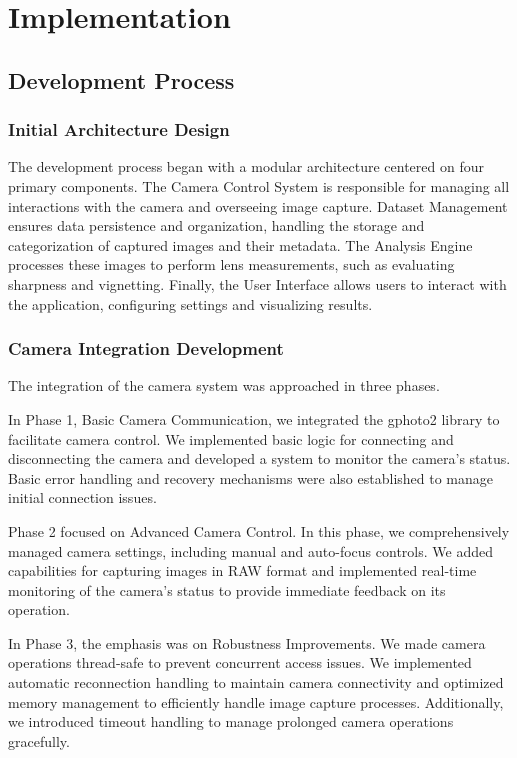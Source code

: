 \chapter{Implementation}

\section{Development Process}

\subsection{Initial Architecture Design}

The development process began with a modular architecture centered on four primary components. The Camera Control System is responsible for managing all interactions with the camera and overseeing image capture. Dataset Management ensures data persistence and organization, handling the storage and categorization of captured images and their metadata. The Analysis Engine processes these images to perform lens measurements, such as evaluating sharpness and vignetting. Finally, the User Interface allows users to interact with the application, configuring settings and visualizing results.

\subsection{Camera Integration Development}

The integration of the camera system was approached in three phases.

In Phase 1, Basic Camera Communication, we integrated the gphoto2 library to facilitate camera control. We implemented basic logic for connecting and disconnecting the camera and developed a system to monitor the camera's status. Basic error handling and recovery mechanisms were also established to manage initial connection issues.

Phase 2 focused on Advanced Camera Control. In this phase, we comprehensively managed camera settings, including manual and auto-focus controls. We added capabilities for capturing images in RAW format and implemented real-time monitoring of the camera's status to provide immediate feedback on its operation.

In Phase 3, the emphasis was on Robustness Improvements. We made camera operations thread-safe to prevent concurrent access issues. We implemented automatic reconnection handling to maintain camera connectivity and optimized memory management to efficiently handle image capture processes. Additionally, we introduced timeout handling to manage prolonged camera operations gracefully.

